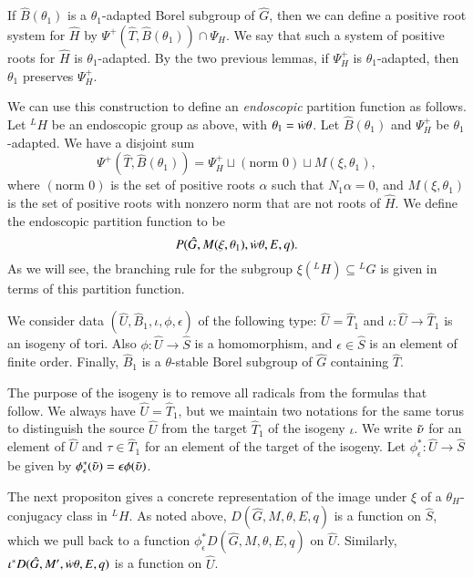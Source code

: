 If $\hat B(\theta_1)$ is a $\theta_1$-adapted Borel subgroup of $\hat G$,
then we can define a positive root system for $\hat H$ by
$\Psi^+(\hat T,\hat B(\theta_1))\cap \Psi_H$.  We say that such a system of positive
roots for $\hat H$ is $\theta_1$-adapted.  By the two previous lemmas,
if $\Psi^+_H$ is $\theta_1$-adapted, then $\theta_1$ preserves $\Psi^+_H$.

We can use this construction to define an {\it endoscopic} partition function as follows.
Let ${}^LH$ be an endoscopic group
as above, with $\theta_1 = \dot w \theta$.
Let $\hat B(\theta_1)$ and $\Psi^+_H$ be $\theta_1$-adapted.  
We have a disjoint sum
\begin{equation}\label{eqn:disj-b1}
\Psi^+(\hat T,\hat B(\theta_1)) = \Psi^+_H \sqcup (\text{norm }  0) \sqcup M(\xi,\theta_1),
\end{equation}
where $(\text{norm } 0)$ is the set of positive roots $\alpha$ such that $N_1\alpha=0$,
and $M(\xi,\theta_1)$ is the set of positive roots with nonzero norm that are not roots
of $\hat H$.
We define the endoscopic partition function to be
\begin{equation}\label{eqn:endo-partition}
P(\hat G,M(\xi,\theta_1),\dot w\theta,E,q).
\end{equation}
As we will see, the branching rule for the subgroup $\xi({}^LH)\subseteq {}^LG$ is
given in terms of this partition function.

We consider data $(\hat U,\hat B_1,\iota,\phi,\epsilon)$ of the following
type: $\hat U = \hat T_1$ and $\iota:\hat U\to \hat T_1$ is an isogeny of tori.
Also $\phi:\hat U\to \hat S$ is a homomorphism, and $\epsilon\in
  \hat S$ is an element 
 of finite order.  Finally, $\hat B_1$ is a $\theta$-stable
 Borel subgroup of $\hat G$ 
containing $\hat T$.

The purpose of the isogeny is to remove all radicals from the formulas that follow.
We always have $\hat U = \hat T_1$, but we maintain two notations for
the same torus to distinguish the source $\hat U$ from the target
$\hat T_1$ of the isogeny $\iota$.  We write $\tilde\upsilon$ for an element of
$\hat U$ and $\tau\in \hat T_1$ for an element of the target of the
isogeny.  Let $\phi^*_\epsilon:\hat U\to\hat S$ be given by $\phi^*_\epsilon(\tilde\upsilon)=
\epsilon\phi(\tilde\upsilon)$.

The next propositon gives a concrete representation of the image under
$\xi$ of a $\theta_H$-conjugacy class in ${}^LH$.
As noted above, $D(\hat G,M,\theta,E,q)$ is a function on $\hat S$,
which we pull back to a function $\phi^*_\epsilon D(\hat G,M,\theta,E,q)$ on $\hat U$.
Similarly, $\iota^* D(\hat G,M',\dot w \theta,E,q)$ is a function on $\hat U$.

